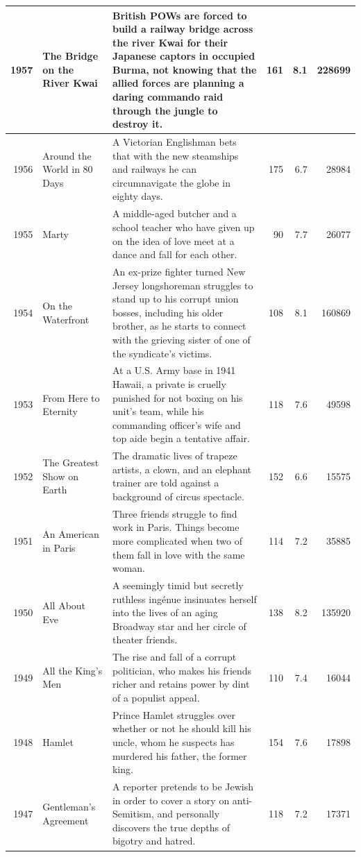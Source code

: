 \documentclass[
]{book}
\begin{document}
\begin{tabular}{r|l|l|r|r|r}
\hline
1957 & The Bridge on the River Kwai & British POWs are forced to build a railway bridge across the river Kwai for their Japanese captors in occupied Burma, not knowing that the allied forces are planning a daring commando raid through the jungle to destroy it. & 161 & 8.1 & 228699\\
\hline
1956 & Around the World in 80 Days & A Victorian Englishman bets that with the new steamships and railways he can circumnavigate the globe in eighty days. & 175 & 6.7 & 28984\\
\hline
1955 & Marty & A middle-aged butcher and a school teacher who have given up on the idea of love meet at a dance and fall for each other. & 90 & 7.7 & 26077\\
\hline
1954 & On the Waterfront & An ex-prize fighter turned New Jersey longshoreman struggles to stand up to his corrupt union bosses, including his older brother, as he starts to connect with the grieving sister of one of the syndicate's victims. & 108 & 8.1 & 160869\\
\hline
1953 & From Here to Eternity & At a U.S. Army base in 1941 Hawaii, a private is cruelly punished for not boxing on his unit's team, while his commanding officer's wife and top aide begin a tentative affair. & 118 & 7.6 & 49598\\
\hline
1952 & The Greatest Show on Earth & The dramatic lives of trapeze artists, a clown, and an elephant trainer are told against a background of circus spectacle. & 152 & 6.6 & 15575\\
\hline
1951 & An American in Paris & Three friends struggle to find work in Paris. Things become more complicated when two of them fall in love with the same woman. & 114 & 7.2 & 35885\\
\hline
1950 & All About Eve & A seemingly timid but secretly ruthless ingénue insinuates herself into the lives of an aging Broadway star and her circle of theater friends. & 138 & 8.2 & 135920\\
\hline
1949 & All the King's Men & The rise and fall of a corrupt politician, who makes his friends richer and retains power by dint of a populist appeal. & 110 & 7.4 & 16044\\
\hline
1948 & Hamlet & Prince Hamlet struggles over whether or not he should kill his uncle, whom he suspects has murdered his father, the former king. & 154 & 7.6 & 17898\\
\hline
1947 & Gentleman's Agreement & A reporter pretends to be Jewish in order to cover a story on anti-Semitism, and personally discovers the true depths of bigotry and hatred. & 118 & 7.2 & 17371\\

\end{tabular}
\end{document}
